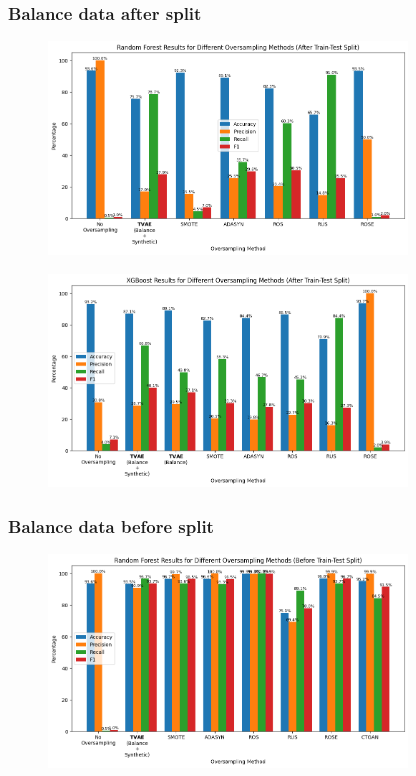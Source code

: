 \documentclass[twoside,11pt]{article}
\begin{document}
\subsubsection{Balance data after split}

\begin{figure}
  \centering
  \includegraphics[width=0.85\textwidth]{images/rf_oversample_after_split.png}
  \caption{}
  \label{fig:rf_oversample_after_split}
\end{figure}

\begin{figure}
  \centering
  \includegraphics[width=0.85\textwidth]{images/xgboost_oversample_after_split.png}
  \caption{}
  \label{fig:xgboost_oversample_after_split}
\end{figure}

\subsubsection{Balance data before split}

\begin{figure}
  \centering
  \includegraphics[width=0.85\textwidth]{images/rf_oversample_before_slit.png}
  \caption{}
  \label{fig:rf_oversample_after_split}
\end{figure}
\end{document}
